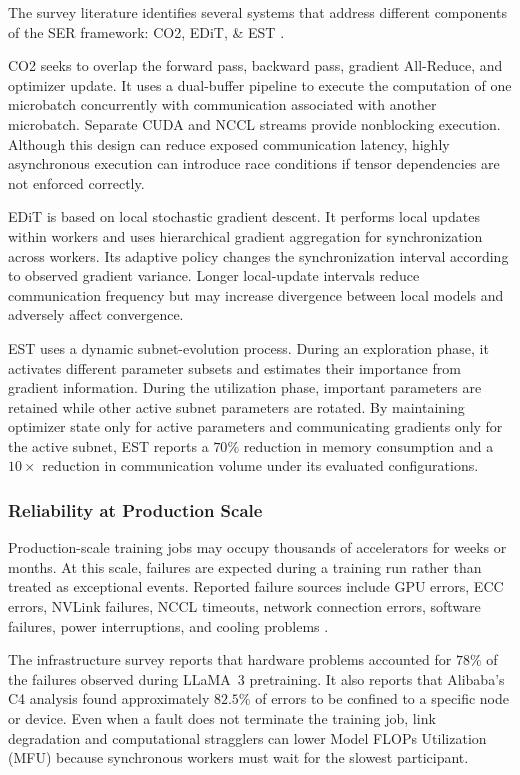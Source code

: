 \documentclass[11pt,journal,final, onecolumn]{IEEEtran}
\begin{document}
The survey literature identifies several systems that address different
components of the SER framework: CO2, EDiT, \& EST
\cite{ZENG2025100174}.

CO2 seeks to overlap the forward pass, backward pass, gradient All-Reduce, and optimizer update. It uses a dual-buffer pipeline to execute the computation of one microbatch concurrently with communication associated with another microbatch. Separate CUDA and NCCL streams provide nonblocking execution. Although this design can reduce exposed communication latency, highly asynchronous execution can introduce race conditions if tensor dependencies are not enforced correctly.

EDiT is based on local stochastic gradient descent. It performs local updates within workers and uses hierarchical gradient aggregation for synchronization across workers. Its adaptive policy changes the synchronization interval according to observed gradient variance. Longer local-update intervals reduce communication frequency but may increase divergence between local models and adversely affect convergence.

EST uses a dynamic subnet-evolution process. During an exploration phase, it activates different parameter subsets and estimates their importance from gradient information. During the utilization phase, important parameters are retained while other active subnet parameters are rotated. By maintaining optimizer state only for active parameters and communicating gradients only for the active subnet, EST reports a \(70\%\) reduction in memory consumption and a \(10\times\) reduction in communication volume under its evaluated configurations.

\subsubsection{Reliability at Production Scale}

Production-scale training jobs may occupy thousands of accelerators for weeks
or months. At this scale, failures are expected during a training run rather
than treated as exceptional events. Reported failure sources include GPU
errors, ECC errors, NVLink failures, NCCL timeouts, network connection errors,
software failures, power interruptions, and cooling problems
\cite{duan2024efficienttraininglargelanguage}.

The infrastructure survey reports that hardware problems accounted for
\(78\%\) of the failures observed during LLaMA~3 pretraining. It also reports
that Alibaba's C4 analysis found approximately \(82.5\%\) of errors to be
confined to a specific node or device. Even when a fault does not terminate the
training job, link degradation and computational stragglers can lower Model
FLOPs Utilization (MFU) because synchronous workers must wait for the slowest
participant.
\end{document}
